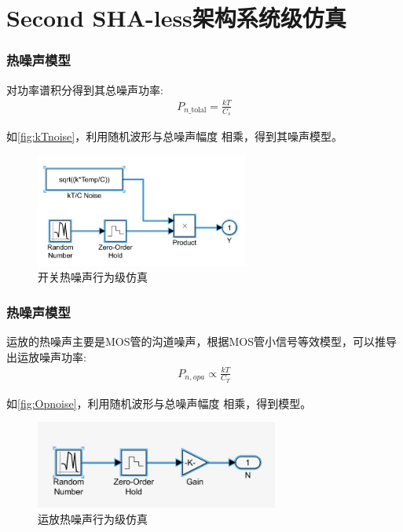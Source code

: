 \documentclass[10pt, mathserif]{beamer}	%
\newcommand{\ftitle}[1]{\frametitle{#1}}	%
\begin{document}
\section{Second SHA-less架构系统级仿真}

	\begin{frame}
		\ftitle{热噪声模型}
		\par 对功率谱积分得到其总噪声功率:
		\begin{equation}
			\begin{split}
				P_{n\_\text {tolal}} = \frac{kT}{C_s}
			\end{split}
		\end{equation}
		\par 如\autoref{fig:kTnoise}，利用随机波形与总噪声幅度
		相乘，得到其噪声模型。
		\begin{figure}[H]
			\centering
			\includegraphics[width=7cm]{kTnoise}
			\caption{\label{fig:kTnoise}开关热噪声行为级仿真}
		\end{figure}
	\end{frame}

	\begin{frame}
		\ftitle{热噪声模型}
		\par 运放的热噪声主要是MOS管的沟道噪声，根据MOS管小信号等效模型，可以推导出运放噪声功率:
		\begin{align}
		P_{n,opa} \propto \frac{kT}{C_T}
		\end{align}
		\par 如\autoref{fig:Opnoise}，利用随机波形与总噪声幅度
		相乘，得到模型。
		\begin{figure}[H]
			\centering
			\includegraphics[width=8cm]{Opnoise}
			\caption{\label{fig:Opnoise}运放热噪声行为级仿真}
		\end{figure}
	\end{frame}
\end{document}
